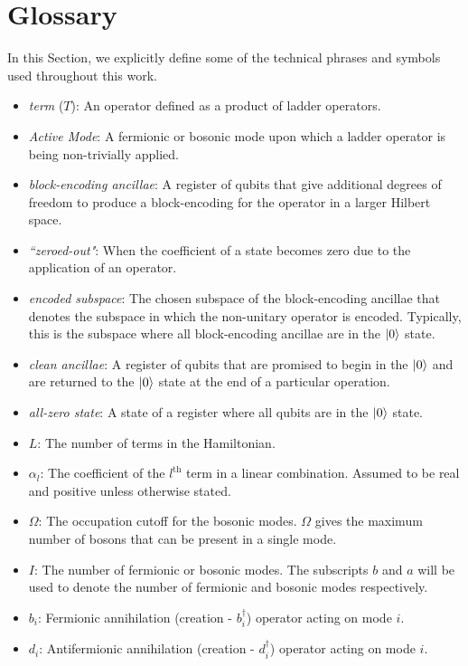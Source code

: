 \section{Glossary}
\label{sec:glossary}

In this Section, we explicitly define some of the technical phrases and symbols used throughout this work.

\begin{itemize}
    \item \textit{term} ($T$): An operator defined as a product of ladder operators.
    \item \textit{Active Mode}: A fermionic or bosonic mode upon which a ladder operator is being non-trivially applied. 
    \item \textit{block-encoding ancillae}: A register of qubits that give additional degrees of freedom to produce a block-encoding for the operator in a larger Hilbert space.
    \item \textit{``zeroed-out"}: When the coefficient of a state becomes zero due to the application of an operator.
    \item \textit{encoded subspace}: The chosen subspace of the block-encoding ancillae that denotes the subspace in which the non-unitary operator is encoded. Typically, this is the subspace where all block-encoding ancillae are in the $\ket{0}$ state.
    \item \textit{clean ancillae}: A register of qubits that are promised to begin in the $\ket{0}$ and are returned to the $\ket{0}$ state at the end of a particular operation. 
    \item \textit{all-zero state}: A state of a register where all qubits are in the $\ket{0}$ state.
    \item $L$: The number of terms in the Hamiltonian.
    \item $\alpha_l$: The coefficient of the $l^\text{th}$ term in a linear combination. Assumed to be real and positive unless otherwise stated.
    \item $\Omega$: The occupation cutoff for the bosonic modes. $\Omega$ gives the maximum number of bosons that can be present in a single mode. 
    \item $I$: The number of fermionic or bosonic modes. The subscripts $b$ and $a$ will be used to denote the number of fermionic and bosonic modes respectively.
    \item $b_i$: Fermionic annihilation (creation - $b_i^\dagger$) operator acting on mode $i$.
    \item $d_i$: Antifermionic annihilation (creation - $d_i^\dagger$) operator acting on mode $i$.

\end{itemize}
